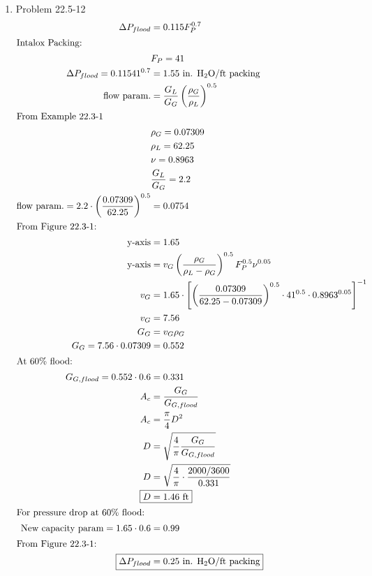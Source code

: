 \documentclass[12pt]{article}
\begin{document}
\begin{enumerate}
\newpage
    \item Problem 22.5-12
    \begin{align*}
        \Delta P_{flood} &= 0.115 F_P^{0.7} \\
        \intertext{Intalox Packing:}
        & F_P = 41 \\
        \Delta P_{flood} = 0.115 41^{0.7} &= 1.55 \text{ in. H$_2$O/ft packing} \\
        \text{flow param.} &= \frac{G_L}{G_G} \left(\frac{\rho_G}{\rho_L}\right)^{0.5} \\
        \intertext{From Example 22.3-1}
        & \rho_G = 0.07309 \\
        & \rho_L = 62.25 \\
        & \nu = 0.8963 \\
        & \frac{G_L}{G_G} = 2.2 \\
        \text{flow param.} = 2.2 \cdot \left(\frac{0.07309}{62.25}\right)^{0.5} &= 0.0754 \\
        \intertext{From Figure 22.3-1:}
        \text{y-axis} &= 1.65 \\
        \text{y-axis} &= v_G \left(\frac{\rho_G}{\rho_L - \rho_G}\right)^{0.5} F_P^{0.5} \nu^{0.05} \\
        v_G &= 1.65 \cdot \left[\left(\frac{0.07309}{62.25 - 0.07309}\right)^{0.5} \cdot 41^{0.5} \cdot 0.8963^{0.05}\right]^{-1} \\
        v_G &= 7.56 \\
        G_G &= v_G \rho_G \\
        G_G = 7.56 \cdot 0.07309 &= 0.552 \\
        \intertext{At 60\% flood:}
        G_{G, flood} = 0.552 \cdot 0.6 &= 0.331 \\
        A_c &= \frac{G_G}{G_{G, flood}} \\
        A_c &= \frac{\pi}{4} D^2 \\
        D &= \sqrt{\frac{4}{\pi} \frac{G_G}{G_{G, flood}}} \\
        D &= \sqrt{\frac{4}{\pi} \cdot \frac{2000 / 3600}{0.331}} \\
        \Aboxed{D &= 1.46 \text{ ft}} \\
        \intertext{For pressure drop at 60\% flood:}
        \text{New capacity param} = 1.65 \cdot 0.6 &= 0.99 \\
        \intertext{From Figure 22.3-1:}
        \Aboxed{\Delta P_{flood} &= 0.25 \text{ in. H$_2$O/ft packing}}
    \end{align*}


\end{enumerate}
\end{document}

